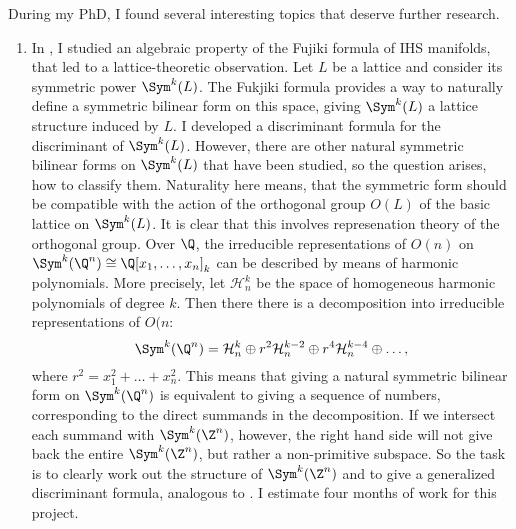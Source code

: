 During my PhD, I found several interesting topics that deserve further research.

\begin{enumerate}
\item In \cite{Symmetric}, I studied an algebraic property of the Fujiki formula of IHS manifolds, that led to a lattice-theoretic observation. Let $L$ be a lattice and consider its symmetric power $\Sym^k (L)$. The Fukjiki formula provides a way to naturally define a symmetric bilinear form on this space, giving $\Sym^k(L)$ a lattice structure induced by $L$. I developed a discriminant formula for the discriminant of $\Sym^k(L)$. However, there are other natural symmetric bilinear forms on $\Sym^k(L)$ that have been studied, so the question arises, how to classify them. Naturality here means, that the symmetric form should be compatible with the action of the orthogonal group $O(L)$ of the basic lattice on $\Sym^k(L)$. It is clear that this involves represenation theory of the orthogonal group. Over $\Q$, the irreducible representations of $O(n)$ on $\Sym^k(\Q^n) \cong \Q[x_1,\ldots, x_n]_k$ can be described by means of harmonic polynomials. More precisely, let $\mathcal H^k_n $ be the space of homogeneous harmonic polynomials of degree $k$. Then there there is a decomposition into irreducible representations of $O(n$:
\[
\Sym^k(\Q^n) = \mathcal H^k_n \oplus r^2\mathcal H^{k-2}_n \oplus r^4\mathcal H^{k-4}_n \oplus \ldots,
\]
where $r^2= x_1^2+\ldots+x_n^2$.
This means that giving a natural symmetric bilinear form on $\Sym^k(\Q^n)$ is equivalent to giving a sequence of numbers, corresponding to the direct summands in the decomposition.
If we intersect each summand with $\Sym^k(\Z^n)$, however, the right hand side will not give back the entire $\Sym^k(\Z^n)$, but rather a non-primitive subspace. So the task is to clearly work out the structure of $\Sym^k(\Z^n)$ and to give a generalized discriminant formula, analogous to \cite{Symmetric}. I estimate four months of work for this project.


\end{enumerate}

